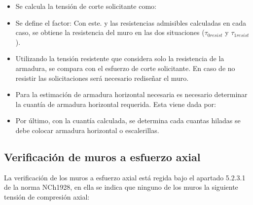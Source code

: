 \begin{itemize}
    \item Se calcula la tensión de corte solicitante como:
    \vspace{-0.5cm}
    \item Se define el factor:
    Con este. y las resistencias admisibles calculadas en cada caso, se obtiene la resistencia del muro en las dos situaciones ($\tau_{0resist}$ y $\tau_{1resist}$ ).
    \item  Utilizando la tensión resistente que considera solo la resistencia de la armadura, se compara  con el esfuerzo de corte solicitante. En caso de no resistir las solicitaciones será necesario rediseñar el muro.
    
    \item Para la estimación de armadura horizontal necesaria es necesario determinar la cuantía de armadura horizontal requerida. Esta viene dada por:
    
    \item Por último, con la cuantía calculada, se determina cada cuantas hiladas se debe colocar armadura horizontal o escalerillas.

\end{itemize}

\subsection{Verificación de muros a esfuerzo axial}

La verificación de los muros a esfuerzo axial está regida bajo el apartado 5.2.3.1 de la norma NCh1928, en ella se indica que ninguno de los muros la siguiente tensión de compresión axial:

